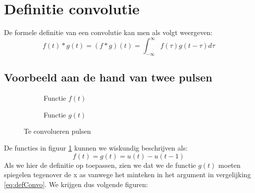 \documentclass[]{subfiles}
\begin{document}
	\section{Definitie convolutie}
	De formele definitie van een convolutie kan men als volgt weergeven: 
	\begin{equation}
		\label{eq:defConvo}
		f(t)\ast g(t) = (f\ast g)(t) = \int_{-\infty}^{\infty} f(\tau) g(t-\tau) d\tau
	\end{equation}
\subsection{Voorbeeld aan de hand van twee pulsen}
\begin{figure}[h]
	\centering
	\begin{subfigure}{.4\textwidth}
		\begin{center}
		\end{center}
	\caption{Functie $f(t)$}
	\end{subfigure}%
	\begin{subfigure}{.4\textwidth}
		\begin{center}
		\end{center}
	\caption{Functie $g(t)$}
	\end{subfigure}
\caption{Te convolueren pulsen}
\label{fig:convoVoorbeeld}
\end{figure}
De functies in figuur \ref{fig:convoVoorbeeld} kunnen we wiskundig beschrijven als:
\begin{equation}
	f(t) = g(t) = u(t)-u(t-1)
\end{equation}
Als we hier de definitie op toepassen, zien we dat we de functie $g(t)$ moeten spiegelen tegenover de x as vanwege het minteken in het argument in vergelijking \ref{eq:defConvo}.  We krijgen dus volgende figuren: \\
\end{document}
